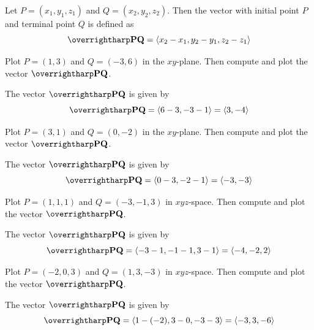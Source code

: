 \documentclass[letterpaper, twoside, 12pt]{book}
\begin{document}
\begin{definition}
  Let $P = \left(x_1,y_1,z_1\right)$ and $Q = \left(x_2,y_2,z_2\right).$
  Then the vector with initial point $P$ and terminal point $Q$ is defined as
  \[
    \harpvec{PQ} = \threevec{x_2 - x_1}{y_2 - y_1}{z_2 - z_1}
  \]
\end{definition}

          \begin{problem}
            Plot $P=(1,3)$ and $Q=(-3,6)$ in the $xy$-plane.
            Then compute and plot the vector $\harpvec{PQ}$.
          \end{problem}

          \begin{solution}
  The vector $\vect{PQ}$ is given by
  \[
    \vect{PQ} = \<6-3,-3-1\> = \<3,-4\>
  \]
          \end{solution}

          \begin{problem}
            Plot $P=(3,1)$ and $Q=(0,-2)$ in the $xy$-plane.
            Then compute and plot the vector $\harpvec{PQ}$.
          \end{problem}

          \begin{solution}
  The vector $\vect{PQ}$ is given by
  \[
    \vect{PQ} = \<0-3,-2-1\> = \<-3,-3\>
  \]
          \end{solution}

          \begin{problem}
            Plot $P=(1,1,1)$ and $Q=(-3,-1,3)$ in $xyz$-space.
            Then compute and plot the vector $\harpvec{PQ}$.
          \end{problem}

          \begin{solution}
  The vector $\vect{PQ}$ is given by
  \[
    \vect{PQ} = \<-3-1,-1-1,3-1\> = \<-4,-2,2\>
  \]
          \end{solution}

          \begin{problem}
            Plot $P=(-2,0,3)$ and $Q=(1,3,-3)$ in $xyz$-space.
            Then compute and plot the vector $\harpvec{PQ}$.
          \end{problem}

          \begin{solution}
  The vector $\vect{PQ}$ is given by
  \[
    \vect{PQ} = \<1-(-2),3-0,-3-3\> = \<-3,3,-6\>
  \]
          \end{solution}
\end{document}
